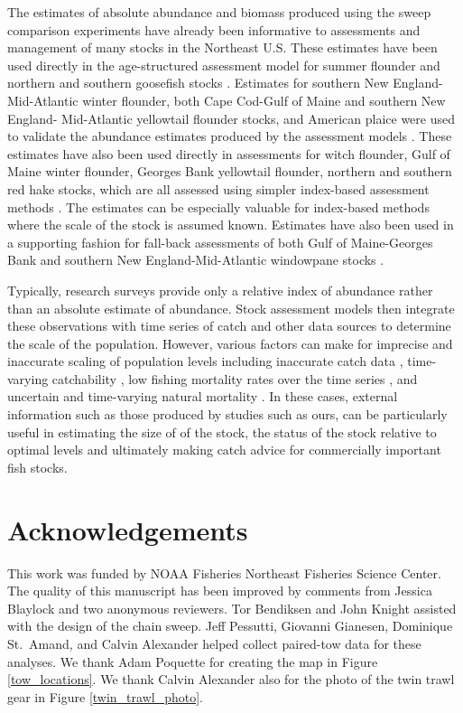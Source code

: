 \documentclass[
  12pt,
]{article}
\begin{document}
The estimates of absolute abundance and biomass produced using the sweep
comparison experiments have already been informative to assessments and
management of many stocks in the Northeast U.S. These estimates have
been used directly in the age-structured assessment model for summer
flounder and northern and southern goosefish stocks
\citep{nefsc19, nefsc20b}. Estimates for southern New
England-Mid-Atlantic winter flounder, both Cape Cod-Gulf of Maine and
southern New England- Mid-Atlantic yellowtail flounder stocks, and
American plaice were used to validate the abundance estimates produced
by the assessment models \citep{nefsc20a}. These estimates have also
been used directly in assessments for witch flounder, Gulf of Maine
winter flounder, Georges Bank yellowtail flounder, northern and southern
red hake stocks, which are all assessed using simpler index-based
assessment methods \citep{legaultmccurdy17,nefsc20, nefsc20a}. The
estimates can be especially valuable for index-based methods where the
scale of the stock is assumed known. Estimates have also been used in a
supporting fashion for fall-back assessments of both Gulf of
Maine-Georges Bank and southern New England-Mid-Atlantic windowpane
stocks \citep{nefsc20a}.

Typically, research surveys provide only a relative index of abundance
rather than an absolute estimate of abundance. Stock assessment models
then integrate these observations with time series of catch and other
data sources to determine the scale of the population. However, various
factors can make for imprecise and inaccurate scaling of population
levels including inaccurate catch data \citep{cadigan16}, time-varying
catchability \citep{wilbergetal09}, low fishing mortality rates over the
time series \citep{adamsetal15}, and uncertain and time-varying natural
mortality \citep{stocketal21}. In these cases, external information such
as those produced by studies such as ours, can be particularly useful in
estimating the size of of the stock, the status of the stock relative to
optimal levels and ultimately making catch advice for commercially
important fish stocks.

\hypertarget{acknowledgements}{%
\section*{Acknowledgements}\label{acknowledgements}}

This work was funded by NOAA Fisheries Northeast Fisheries Science
Center. The quality of this manuscript has been improved by comments
from Jessica Blaylock and two anonymous reviewers. Tor Bendiksen and
John Knight assisted with the design of the chain sweep. Jeff Pessutti,
Giovanni Gianesen, Dominique St.~Amand, and Calvin Alexander helped
collect paired-tow data for these analyses. We thank Adam Poquette for
creating the map in Figure \ref{tow_locations}. We thank Calvin
Alexander also for the photo of the twin trawl gear in Figure
\ref{twin_trawl_photo}.
\end{document}
